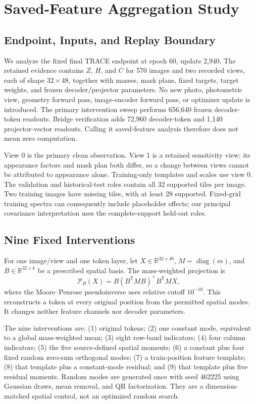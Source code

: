 \section{Saved-Feature Aggregation Study}\label{sec:aggregation}
\subsection{Endpoint, Inputs, and Replay Boundary}
We analyze the fixed final TRACE endpoint at epoch 60, update 2,940. The retained evidence contains $Z$, $H$, and $C$ for 570 images and two recorded views, each of shape $32\times48$, together with masses, mask plans, fixed targets, target weights, and frozen decoder/projector parameters. No new photo, photometric view, geometry forward pass, image-encoder forward pass, or optimizer update is introduced. The primary intervention sweep performs 656,640 frozen decoder-token readouts. Bridge verification adds 72,960 decoder-token and 1,140 projector-vector readouts. Calling it saved-feature analysis therefore does not mean zero computation.\AIdraftingnote

View 0 is the primary clean observation. View 1 is a retained sensitivity view; its appearance factors and mask plan both differ, so a change between views cannot be attributed to appearance alone. Training-only templates and scales use view 0. The validation and historical-test roles contain all 32 supported tiles per image. Two training images have missing tiles, with at least 28 supported. Fixed-grid training spectra can consequently include placeholder effects; our principal covariance interpretation uses the complete-support held-out roles.

\subsection{Nine Fixed Interventions}
For one image/view and one token layer, let $X\in\mathbb{R}^{32\times48}$, $M=\operatorname{diag}(m)$, and $B\in\mathbb{R}^{32\times k}$ be a prescribed spatial basis. The mass-weighted projection is
\begin{equation}\label{eq:projection}
 \mathcal{P}_B(X)=B(B^{\mathsf T}MB)^+B^{\mathsf T}MX,
\end{equation}
where the Moore--Penrose pseudoinverse uses relative cutoff $10^{-10}$. This reconstructs a token at every original position from the permitted spatial modes. It changes neither feature channels nor decoder parameters.

The nine interventions are: (1) original tokens; (2) one constant mode, equivalent to a global mass-weighted mean; (3) eight row-band indicators; (4) four column indicators; (5) the five source-defined spatial moments; (6) a constant plus four fixed random zero-sum orthogonal modes; (7) a train-position feature template; (8) that template plus a constant-mode residual; and (9) that template plus five residual moments. Random modes are generated once with seed 462225 using Gaussian draws, mean removal, and QR factorization. They are a dimension-matched spatial control, not an optimized random search.

